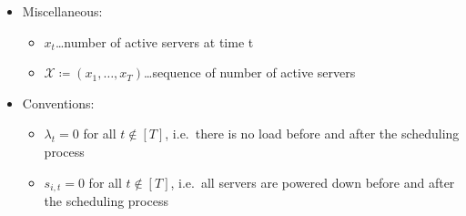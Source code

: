 \documentclass[hidelinks]{article}
\theoremstyle{plain}
\theoremstyle{definition}
\theoremstyle{rem}
\newcommand{\mx}{\mathcal{X}}
\begin{document}
\begin{itemize}
\item Miscellaneous:
\begin{itemize}
	\item $x_t$\ldots number of active servers at time t
	\item $\mx\coloneqq(x_1,\ldots,x_T)$\ldots sequence of number of active servers
\end{itemize}

\item Conventions:
\begin{itemize}
	\item $\lambda_{t}=0$ for all $t\notin[T]$, i.e.\ there is no load before and after the scheduling process
	\item $s_{i,t}=0$ for all $t\notin[T]$, i.e.\ all servers are powered down before and after the scheduling process
\end{itemize}
\end{itemize}
\normalsize
\end{document}
